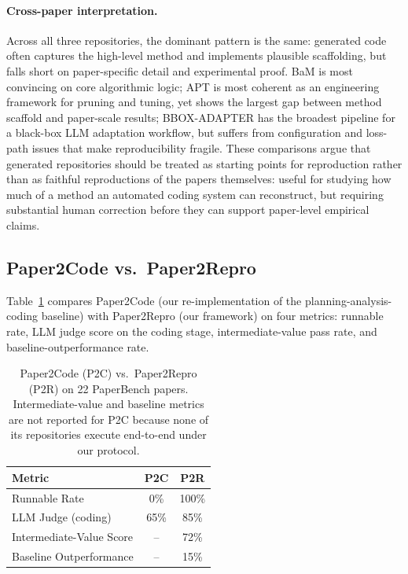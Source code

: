 \documentclass[11pt]{article}
\begin{document}
\paragraph{Cross-paper interpretation.} Across all three repositories,
the dominant pattern is the same: generated code often captures the
high-level method and implements plausible scaffolding, but falls
short on paper-specific detail and experimental proof. BaM is most
convincing on core algorithmic logic; APT is most coherent as an
engineering framework for pruning and tuning, yet shows the largest
gap between method scaffold and paper-scale results; BBOX-ADAPTER
has the broadest pipeline for a black-box LLM adaptation workflow,
but suffers from configuration and loss-path issues that make
reproducibility fragile. These comparisons argue that generated
repositories should be treated as starting points for reproduction
rather than as faithful reproductions of the papers themselves:
useful for studying how much of a method an automated coding system
can reconstruct, but requiring substantial human correction before
they can support paper-level empirical claims.

\subsection{Paper2Code vs.\ Paper2Repro}

Table~\ref{tab:p2c_vs_p2r} compares Paper2Code (our
re-implementation of the planning-analysis-coding baseline) with
Paper2Repro (our framework) on four metrics: runnable rate, LLM
judge score on the coding stage, intermediate-value pass rate,
and baseline-outperformance rate.

\begin{table}[t]
\centering
\small
\begin{tabular}{lcc}
\toprule
\textbf{Metric} & \textbf{P2C} & \textbf{P2R} \\
\midrule
Runnable Rate                 & 0\%   & 100\% \\
LLM Judge (coding)            & 65\%  & 85\%  \\
Intermediate-Value Score      & --    & 72\%  \\
Baseline Outperformance       & --    & 15\%  \\
\bottomrule
\end{tabular}
\caption{Paper2Code (P2C) vs.\ Paper2Repro (P2R) on 22
PaperBench papers. Intermediate-value and baseline metrics are
not reported for P2C because none of its repositories execute
end-to-end under our protocol.}
\label{tab:p2c_vs_p2r}
\end{table}
\end{document}
